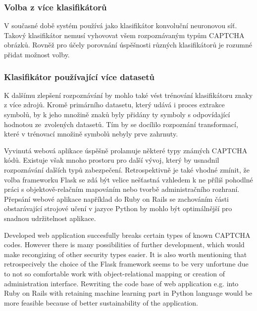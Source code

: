 \documentclass[
  field=ainfp,
  master=true,
  biblatex,
  sourcecodes=false,
  theorems=false,
  glossaries,
  index
]{kidiplom}
\begin{document}
\subsubsection*{Volba z více klasifikátorů} 
V současné době systém používá jako klasifikátor konvoluční neuronovou síť. Takový klasifikátor nemusí vyhovovat všem rozpoznávaným typům CAPTCHA obrázků. Rovněž pro účely porovnání úspěšnosti různých klasifikátorů je rozumné přidat možnost volby. 

\subsubsection*{Klasifikátor používající více datasetů} 
K dalšímu zlepšení rozpoznávání by mohlo také vést trénování klasifikátoru znaky z více zdrojů. Kromě primárního datasetu, který udává i proces extrakce symbolů, by k jeho množině znaků byly přidány ty symboly s odpovídající hodnotou ze~zvolených datasetů. Tím by se docílilo rozpoznání transformací, které v trénovací množině symbolů nebyly prve zahrnuty.


\begin{kiconclusions}
Vyvinutá webová aplikace úspěšně prolamuje některé typy známých CAPTCHA kódů. Existuje však mnoho prostoru pro další vývoj, který by usnadnil rozpoz\-návání dalších typů zabezpečení. Retrospektivně je také vhodné zmínit, že volba frameworku Flask se zdá být velice nešťastná vzhledem k ne příliš pohodlné práci s objektově-relačním mapováním nebo tvorbě administračního rozhraní. Přepsání webové aplikace například do Ruby on Rails se zachováním části obstarávající strojové učení v jazyce Python by mohlo být optimálnější pro snadnou udržitelnost aplikace.
\end{kiconclusions}

\begin{kiconclusions}[english]
Developed web application succesfully breaks certain types of known CAPTCHA codes. However there is many possibilities of further development, which would make recongizing of other security types easier.  It is also worth mentioning that retrospecively the choice of the Flask framework seems to be very unfortune due to not so comfortable work with object-relational mapping or creation of administration interface. Rewriting the code base of web application e.g. into Ruby on Rails with retaining machine learning part in Python language would be more feasible because of better sustainability of the application. 
\end{kiconclusions}
\end{document}
